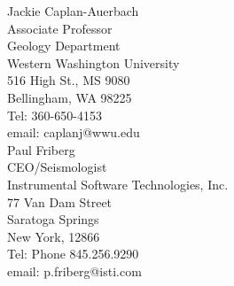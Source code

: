 \documentclass[margin,line]{res}
\begin{document}
\begin{resume}
\begin{multicols}{2}
Jackie Caplan-Auerbach \\
Associate Professor \\
Geology Department \\
Western Washington University \\
516 High St., MS 9080 \\
Bellingham, WA 98225 \\
Tel: 360-650-4153 \\
email: caplanj@wwu.edu \\

Paul Friberg \\    
CEO/Seismologist \\
Instrumental Software Technologies, Inc. \\
77 Van Dam Street \\
Saratoga Springs \\
New York, 12866 \\
Tel: Phone 845.256.9290 \\
email: p.friberg@isti.com \\

\end{multicols}

\begin{comment}
\textbf{Capacities in which known:}\\
Richard Herd was Senior Volcanologist at Montserrat Volcano Observatory 2000-2003, while I was Seismic Network Manager.\\
Silvio De Angelis has held many of the same positions as I have: postdoc of Steve McNutt at AVO 2004-2006 (me 1998-2000); Seismic Network Manager at MVO 2006-2009 (me 2000-2003); Staff Seismologist at UAF Geophysical Institute 2009-2012 (me 2006-2013)\\
Jackie Caplan ...
\end{comment}



\end{resume}
\end{document}
